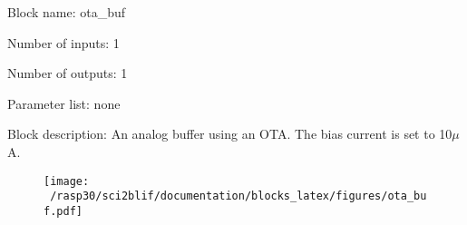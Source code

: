 \pagebreak

Block name: ota\_buf

Number of inputs: 1

Number of outputs: 1

Parameter list: none

Block description: 
An analog buffer using an OTA. The bias current is set to 10$\mu$A.

\begin{figure}[H]  %
\texttt{[image: ~/rasp30/sci2blif/documentation/blocks\_latex/figures/ota\_buf.pdf]}
\end{figure}

